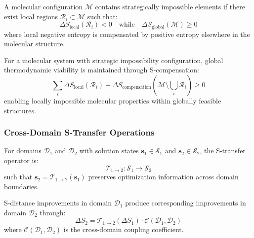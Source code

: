 ﻿\documentclass[11pt,a4paper]{article}
\begin{document}
\begin{definition}
A molecular configuration $\mathcal{M}$ contains strategically impossible elements if there exist local regions $\mathcal{R}_i \subset \mathcal{M}$ such that:
\begin{equation}
\Delta S_{\text{local}}(\mathcal{R}_i) < 0 \quad \text{while} \quad \Delta S_{\text{global}}(\mathcal{M}) \geq 0
\end{equation}
where local negative entropy is compensated by positive entropy elsewhere in the molecular structure.
\end{definition}

\begin{theorem}
For a molecular system with strategic impossibility configuration, global thermodynamic viability is maintained through S-compensation:
\begin{equation}
\sum_{i} \Delta S_{\text{local}}(\mathcal{R}_i) + \Delta S_{\text{compensation}}(\mathcal{M} \setminus \bigcup_i \mathcal{R}_i) \geq 0
\end{equation}
enabling locally impossible molecular properties within globally feasible structures.
\end{theorem}

\subsubsection{Cross-Domain S-Transfer Operations}

\begin{definition}
For domains $\mathcal{D}_1$ and $\mathcal{D}_2$ with solution states $\mathbf{s}_1 \in \mathcal{S}_1$ and $\mathbf{s}_2 \in \mathcal{S}_2$, the S-transfer operator is:
\begin{equation}
\mathcal{T}_{1 \to 2}: \mathcal{S}_1 \to \mathcal{S}_2
\end{equation}
such that $\mathbf{s}_2 = \mathcal{T}_{1 \to 2}(\mathbf{s}_1)$ preserves optimization information across domain boundaries.
\end{definition}

\begin{theorem}
S-distance improvements in domain $\mathcal{D}_1$ produce corresponding improvements in domain $\mathcal{D}_2$ through:
\begin{equation}
\Delta S_2 = \mathcal{T}_{1 \to 2}(\Delta S_1) \cdot \mathcal{C}(\mathcal{D}_1, \mathcal{D}_2)
\end{equation}
where $\mathcal{C}(\mathcal{D}_1, \mathcal{D}_2)$ is the cross-domain coupling coefficient.
\end{theorem}
\end{document}
